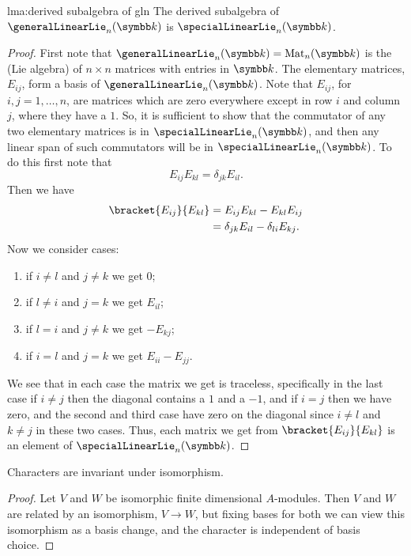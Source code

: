 \begin{lma}{}{lma:derived subalgebra of gln}
    The derived subalgebra of \(\generalLinearLie_n(\field)\) is \(\specialLinearLie_n(\field)\).
    \begin{proof}
        First note that \(\generalLinearLie_n(\field) = \matrices{n}{\field}\) is the (Lie algebra) of \(n \times n\) matrices with entries in \(\field\).
        The elementary matrices, \(E_{ij}\), form a basis of \(\generalLinearLie_n(\field)\).
        Note that \(E_{ij}\), for \(i, j = 1, \dotsc, n\), are matrices which are zero everywhere except in row \(i\) and column \(j\), where they have a \(1\).
        So, it is sufficient to show that the commutator of any two elementary matrices is in \(\specialLinearLie_n(\field)\), and then any linear span of such commutators will be in \(\specialLinearLie_n(\field)\).
        To do this first note that
        \begin{equation}
            E_{ij}E_{kl} = \delta_{jk} E_{il}.
        \end{equation}
        Then we have
        \begin{align}
            \bracket{E_{ij}}{E_{kl}} &= E_{ij}E_{kl} - E_{kl}E_{ij}\\
            &= \delta_{jk}E_{il} - \delta_{li}E_{kj}.
        \end{align}
        Now we consider cases:
        \begin{enumerate}
            \item if \(i \ne l\) and \(j \ne k\) we get \(0\);
            \item if \(l \ne i\) and \(j = k\) we get \(E_{il}\);
            \item if \(l = i\) and \(j \ne k\) we get \(-E_{kj}\);
            \item if \(i = l\) and \(j = k\) we get \(E_{ii} - E_{jj}\).
        \end{enumerate}
        We see that in each case the matrix we get is traceless, specifically in the last case if \(i \ne j\) then the diagonal contains a \(1\) and a \(-1\), and if \(i = j\) then we have zero, and the second and third case have zero on the diagonal since \(i \ne l\) and \(k \ne j\) in these two cases.
        Thus, each matrix we get from \(\bracket{E_{ij}}{E_{kl}}\) is an element of \(\specialLinearLie_n(\field)\).
    \end{proof}
\end{lma}

\begin{lma}{}{}
    Characters are invariant under isomorphism.
    \begin{proof}
        Let \(V\) and \(W\) be isomorphic finite dimensional \(A\)-modules.
        Then \(V\) and \(W\) are related by an isomorphism, \(V \to W\), but fixing bases for both we can view this isomorphism as a basis change, and the character is independent of basis choice.
    \end{proof}
\end{lma}

